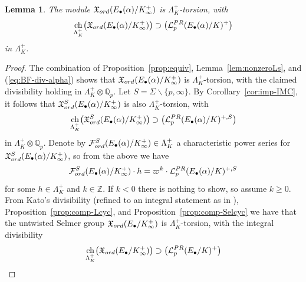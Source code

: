 \documentclass[a4paper,10pt]{amsart}
\numberwithin{equation}{section}
\numberwithin{equation}{section}
\theoremstyle{plain}
\theoremstyle{definition}
\theoremstyle{definition}
\theoremstyle{plain}
\theoremstyle{plain}
\newtheorem{lemma}[thm]{Lemma}
\theoremstyle{plain}
\theoremstyle{plain}
\newcommand{\Z}{\mathbb{Z}}
\newcommand{\Q}{\mathbb{Q}}
\newcommand{\X}{\mathfrak{X}}
\DeclareMathOperator{\ch}{ch}
\newcommand{\Lcal}{\mathcal{L}}
\newcommand{\Fcal}{\mathcal{F}}
\begin{document}

\begin{lemma}\label{lem:int-div-PR}
The module $\X_{\rm ord}(E_\bullet(\alpha)/K_\infty^+)$ is $\Lambda_K^+$-torsion, with
\begin{equation}\label{eq:cyc-ord-alpha}
\ch_{\Lambda_K^+}\bigl(\X_{\rm ord}(E_\bullet(\alpha)/K_\infty^+)\bigr)\supset\bigl(\Lcal_p^{\rm PR}(E_\bullet(\alpha)/K)^+\bigr) %
\end{equation}
in $\Lambda_K^+$.
\end{lemma}

\begin{proof}
The combination of Proposition~\ref{prop:equiv}, Lemma~\ref{lem:nonzeroLs}, and (\ref{eq:BF-div-alpha}) shows that $\X_{\rm ord}(E_\bullet(\alpha)/K_\infty^+)$ is $\Lambda_K^+$-torsion, with the claimed divisibility holding in $\Lambda_K^+\otimes\Q_p$. Let $S=\Sigma\smallsetminus\{p,\infty\}$. By Corollary~\ref{cor:imp-IMC}, it follows that $\mathfrak{X}_{\rm ord}^S(E_\bullet(\alpha)/K_\infty^+)$ is also $\Lambda_K^+$-torsion, with
\begin{equation}\label{eq:ord-cyc-Qp}
\ch_{\Lambda_K^+}\bigl(\X_{\rm ord}^S(E_\bullet(\alpha)/K_\infty^+)\bigr)\supset\bigl(\Lcal_p^{\rm PR}(E_\bullet(\alpha)/K)^{+,S}\bigr) %
\end{equation}
in $\Lambda_K^+\otimes\Q_p$. Denote by $\Fcal_{\rm ord}^S(E_\bullet(\alpha)/K_\infty^+)\in\Lambda_K^+$ a characteristic power series for $\X_{\rm ord}^S(E_\bullet(\alpha)/K_\infty^+)$, so from the above we have
\begin{equation}\label{eq:div-h}
\Fcal_{\rm ord}^S(E_\bullet(\alpha)/K_\infty^+)\cdot h=\varpi^k\cdot\Lcal_p^{\rm PR}(E_\bullet(\alpha)/K)^{+,S}
\end{equation}
for some $h\in\Lambda_K^+$ and $k\in\Z$. If $k<0$ there is nothing to show, so assume $k\geq 0$. From Kato's divisibility \cite[Thm.~17.4]{kato-euler-systems} (refined to an integral statement as in \cite[Thm.~16]{wuthrich-int}), Proposition~\ref{prop:comp-Lcyc}, and Proposition~\ref{prop:comp-Selcyc} we have that the untwisted Selmer group $\X_{\rm ord}(E_\bullet/K_\infty^+)$ is $\Lambda_K^+$-torsion, with the integral divisibility
\begin{equation}\label{eq:final-cyc-ord-1}
\ch_{\Lambda_K^+}\bigl(\X_{\rm ord}(E_\bullet/K_\infty^+)\bigr)\supset\bigl(\Lcal_p^{\rm PR}(E_\bullet/K)^+\bigr)

\end{equation}
\end{proof}
\end{document}
